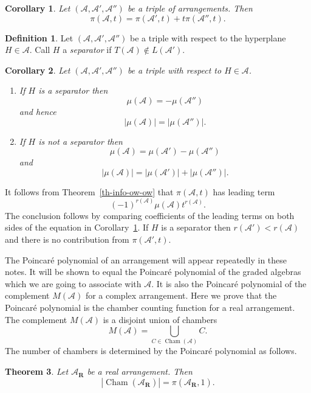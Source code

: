 \documentclass[draft]{amsart}
\newtheorem{thm}{Theorem}[section]
\newtheorem{cor}[thm]{Corollary}
\theoremstyle{definition}
\newtheorem{defn}{Definition}[section]
\theoremstyle{remark}
\newcommand{\thmref}[1]{Theorem~\ref{#1}}
\newcommand{\A}{\mathcal{A}}
\begin{document}
\begin{cor}\label{tripleA}
Let $(\A,\A',\A'')$ be a triple of arrangements. Then
\[ \pi (\A,t) = \pi (\A',t) + t \pi (\A'',t). \]
\end{cor}

\begin{defn}
Let $(\A,\A',\A'')$ be a triple with respect to
the hyperplane $H \in \A$. Call $H$ a \textit{separator}
if $T(\A) \not\in L(\A')$.
\end{defn}

\begin{cor}\label{nsep}
Let $(\A,\A',\A'')$ be a triple with respect to $H \in \A$.
\begin{enumerate}
\renewcommand{\labelenumi}{(\roman{enumi})}
\item
If $H$ is a separator then
\[ \mu (\A) = - \mu (\A'') \]
and hence
\[ |\mu (\A)| = | \mu (\A'')|. \]

\item If $H$ is not a separator then
\[\mu (\A) = \mu (\A') - \mu (\A'') \]
and
\[ |\mu (\A)| = |\mu (\A')| + |\mu (\A'')|. \]
\end{enumerate}
\end{cor}

\begin{pf}
It follows from \thmref{th-info-ow-ow} that $\pi(\A,t)$
has leading term
\[(-1)^{r(\A)}\mu (\A)t^{r(\A)}.\]
The conclusion
follows by comparing coefficients of the leading
terms on both sides of the equation in
Corollary~\ref{tripleA}. If $H$ is a separator then
$r(\A') < r(\A)$ and there is no contribution
from $\pi (\A',t)$.
\end{pf}

The Poincar\'e polynomial of an arrangement
will appear repeatedly
in these notes. It will be shown to equal the
Poincar\'e polynomial
of the graded algebras which we are going to
associate with $\A$. It is also the Poincar\'e
polynomial of the complement $M(\A)$ for a
complex arrangement. Here we prove
that the Poincar\'e polynomial is the chamber
counting function for a real arrangement. The
complement $M(\A)$ is a disjoint union of chambers
\[M(\A) = \bigcup_{C \in \operatorname{Cham}(\A)} C.\]
The number
of chambers is determined by the Poincar\'e
polynomial as follows.

\begin{thm}\label{th-realarr}
Let $\A_{\mathbf{R}}$ be a real arrangement. Then
\[ |\operatorname{Cham}(\A_{\mathbf{R}})| = \pi (\A_{\mathbf{R}},1). \]
\end{thm}
\end{document}
